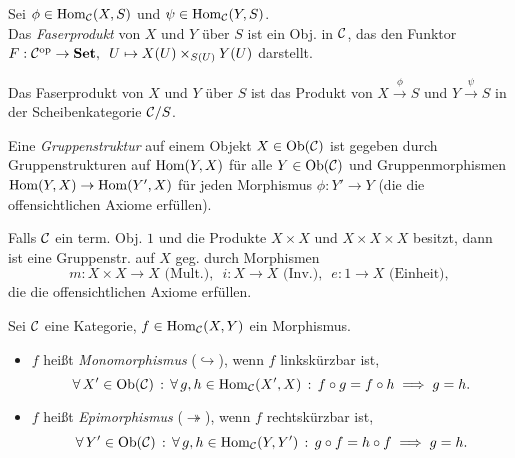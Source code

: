 \documentclass{cheat-sheet}
\begin{document}
\begin{defn}
  Sei $\phi \in \operatorname{Hom}_{\mathcal{C}}(X, S)$ und $\psi \in \operatorname{Hom}_{\mathcal{C}}(Y, S)$. \\
  Das \emph{Faserprodukt} von $X$ und $Y$ über $S$ ist ein Obj. in $\mathcal{C}$, das den Funktor
  $F : \mathcal{C}^{\mathrm{op}} \to \mathbf{Set}, \enspace U \mapsto X(U) \times_{S(U)} Y(U)$ darstellt.
\end{defn}

\begin{bem}
  Das Faserprodukt von $X$ und $Y$ über $S$ ist das Produkt von $X \xrightarrow{\phi} S$ und $Y \xrightarrow{\psi} S$ in der Scheibenkategorie $\mathcal{C}/S$.
\end{bem}


\begin{defn}
  Eine \emph{Gruppenstruktur} auf einem Objekt $X \in \operatorname{Ob}(\mathcal{C})$ ist gegeben durch Gruppenstrukturen auf $\operatorname{Hom}(Y, X)$ für alle $Y \in \operatorname{Ob}(\mathcal{C})$ und Gruppenmorphismen $\operatorname{Hom}(Y, X) \to \operatorname{Hom}(Y', X)$ für jeden Morphismus $\phi : Y' \to Y$ (die die offensichtlichen Axiome erfüllen).
\end{defn}

\begin{bem}
  Falls $\mathcal{C}$ ein term. Obj. $1$ und die Produkte $X \!\times\! X$ und $X \!\times\! X \!\times\! X$ besitzt, dann ist eine Gruppenstr. auf $X$ geg. durch Morphismen
  \[
    m : X \times X \to X \text{ (Mult.)}, \enspace
    i : X \to X \text{ (Inv.)}, \enspace
    e : 1 \to X \text{ (Einheit)},
  \]
  die die offensichtlichen Axiome erfüllen.
\end{bem}

\begin{defn}
  Sei $\mathcal{C}$ eine Kategorie, $f \in \operatorname{Hom}_{\mathcal{C}}(X, Y)$ ein Morphismus.
  \begin{itemize}
    \item $f$ heißt \emph{Monomorphismus} (${\hookrightarrow}$), wenn $f$ linkskürzbar ist, \dh{}
    \[
      \forall \, {X' \in \operatorname{Ob}(\mathcal{C})} \,:\, \forall \, {g, h \in \operatorname{Hom}_{\mathcal{C}}(X', X)} \,:\,
      f \circ g = f \circ h \implies g = h.
    \]
    \item $f$ heißt \emph{Epimorphismus} (${\twoheadrightarrow}$), wenn $f$ rechtskürzbar ist, \dh{}
    \[
      \forall \, {Y' \in \operatorname{Ob}(\mathcal{C})} \,:\, \forall \, {g, h \in \operatorname{Hom}_{\mathcal{C}}(Y, Y')} \,:\,
      g \circ f = h \circ f \implies g = h.
    \]
  \end{itemize}
\end{defn}
\end{document}
